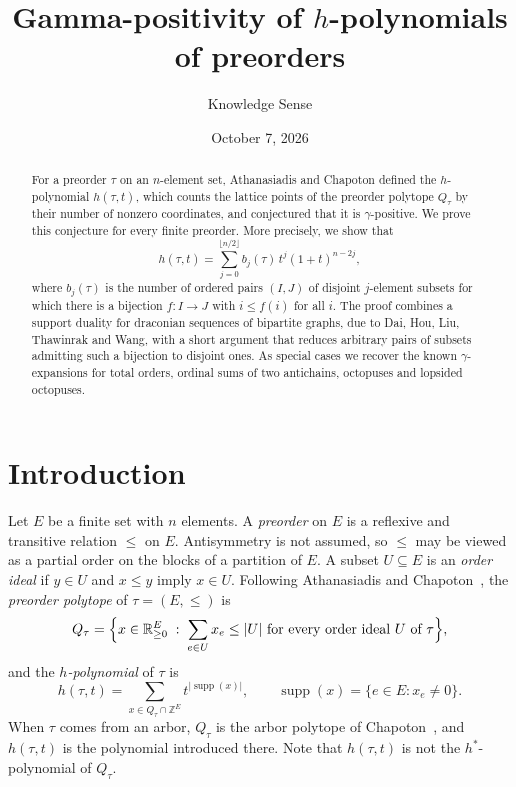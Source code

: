 \documentclass[11pt]{amsart}
\title{Gamma-positivity of $h$-polynomials of preorders}
\author{Knowledge Sense}
\date{October 7, 2026}
\theoremstyle{definition}
\theoremstyle{remark}
\numberwithin{equation}{section}
\newcommand{\ZZ}{\mathbb{Z}}
\newcommand{\RR}{\mathbb{R}}
\newcommand{\supp}{\operatorname{supp}}
\begin{document}
\begin{abstract}
For a preorder $\tau$ on an $n$-element set, Athanasiadis and Chapoton defined the $h$-polynomial $h(\tau,t)$, which counts the lattice points of the preorder polytope $Q_\tau$ by their number of nonzero coordinates, and conjectured that it is $\gamma$-positive. We prove this conjecture for every finite preorder. More precisely, we show that
\[
h(\tau,t)=\sum_{j=0}^{\lfloor n/2\rfloor} b_j(\tau)\,t^j(1+t)^{n-2j},
\]
where $b_j(\tau)$ is the number of ordered pairs $(I,J)$ of disjoint $j$-element subsets for which there is a bijection $f\colon I\to J$ with $i\le f(i)$ for all $i$. The proof combines a support duality for draconian sequences of bipartite graphs, due to Dai, Hou, Liu, Thawinrak and Wang, with a short argument that reduces arbitrary pairs of subsets admitting such a bijection to disjoint ones. As special cases we recover the known $\gamma$-expansions for total orders, ordinal sums of two antichains, octopuses and lopsided octopuses.
\end{abstract}

\maketitle

\section{Introduction}\label{sec:intro}

Let $E$ be a finite set with $n$ elements. A \emph{preorder} on $E$ is a reflexive and transitive relation $\le$ on $E$. Antisymmetry is not assumed, so $\le$ may be viewed as a partial order on the blocks of a partition of $E$. A subset $U\subseteq E$ is an \emph{order ideal} if $y\in U$ and $x\le y$ imply $x\in U$. Following Athanasiadis and Chapoton~\cite{AC}, the \emph{preorder polytope} of $\tau=(E,\le)$ is
\[
Q_\tau=\Bigl\{x\in\RR_{\ge 0}^E \;:\; \sum_{e\in U}x_e\le |U| \text{ for every order ideal } U \text{ of } \tau\Bigr\},
\]
and the \emph{$h$-polynomial} of $\tau$ is
\[
h(\tau,t)=\sum_{x\in Q_\tau\cap\ZZ^E} t^{|\supp(x)|},\qquad \supp(x)=\{e\in E: x_e\neq 0\}.
\]
When $\tau$ comes from an arbor, $Q_\tau$ is the arbor polytope of Chapoton~\cite{Cha}, and $h(\tau,t)$ is the polynomial introduced there. Note that $h(\tau,t)$ is not the $h^*$-polynomial of $Q_\tau$.
\end{document}
